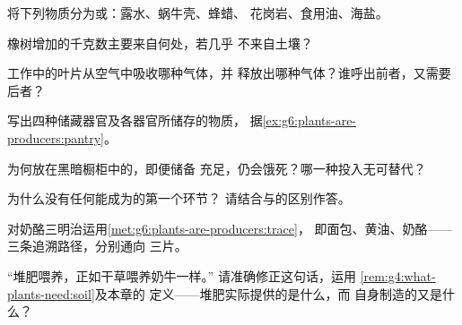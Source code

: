 \begin{exercise}[$\star$]\label{exo:g6:plants-are-producers:3}
将下列物质分为或：露水、蜗牛壳、蜂蜡、
花岗岩、食用油、海盐。
\end{exercise}

\begin{exercise}[$\star$]\label{exo:g6:plants-are-producers:4}
橡树增加的千克数主要来自何处，若几乎
不来自土壤？
\end{exercise}

\begin{exercise}[$\star$]\label{exo:g6:plants-are-producers:5}
工作中的叶片从空气中吸收哪种气体，并
释放出哪种气体？谁呼出前者，又需要
后者？
\end{exercise}

\begin{exercise}[$\star$]\label{exo:g6:plants-are-producers:6}
写出四种储藏器官及各器官所储存的物质，
据\cref{ex:g6:plants-are-producers:pantry}。
\end{exercise}

\begin{exercise}[$\star\star$]\label{exo:g6:plants-are-producers:7}
为何放在黑暗橱柜中的，即便储备
充足，仍会饿死？哪一种投入无可替代？
\end{exercise}

\begin{exercise}[$\star\star$]\label{exo:g6:plants-are-producers:8}
为什么没有任何能成为的第一个环节？
请结合与的区别作答。
\end{exercise}

\begin{exercise}[$\star\star$]\label{exo:g6:plants-are-producers:9}
对奶酪三明治运用\cref{met:g6:plants-are-producers:trace}，
即面包、黄油、奶酪——三条追溯路径，分别通向
三片。
\end{exercise}

\begin{exercise}[$\star\star$]\label{exo:g6:plants-are-producers:10}
“堆肥喂养，正如干草喂养奶牛一样。”
请准确修正这句话，运用
\cref{rem:g4:what-plants-need:soil}及本章的
定义——堆肥实际提供的是什么，而
自身制造的又是什么？
\end{exercise}

